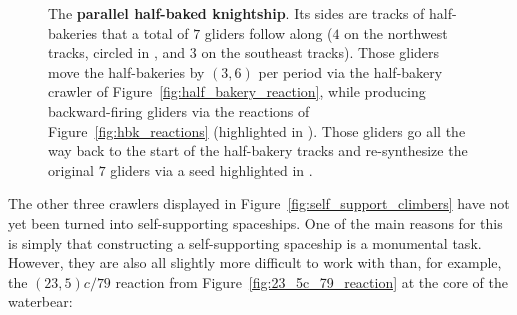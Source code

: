 \begin{figure}[!htb]
	\centering
	\caption{The \textbf{parallel half-baked knightship}. Its sides are tracks of half-bakeries that a total of $7$ gliders follow along ($4$ on the northwest tracks, circled in , and $3$ on the southeast tracks). Those gliders move the half-bakeries by $(3,6)$ per period via the half-bakery crawler of Figure~\ref{fig:half_bakery_reaction}, while producing backward-firing gliders via the reactions of Figure~\ref{fig:hbk_reactions} (highlighted in ). Those gliders go all the way back to the start of the half-bakery tracks and re-synthesize the original $7$ gliders via a seed highlighted in .}\label{fig:parallel_hbk}
\end{figure}

The other three crawlers displayed in Figure~\ref{fig:self_support_climbers} have not yet been turned into self-supporting spaceships. One of the main reasons for this is simply that constructing a self-supporting spaceship is a monumental task. However, they are also all slightly more difficult to work with than, for example, the $(23,5)c/79$ reaction from Figure~\ref{fig:23_5c_79_reaction} at the core of the waterbear:\smallskip

